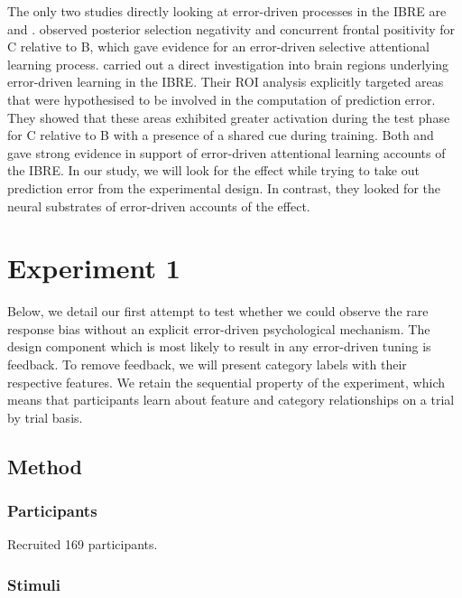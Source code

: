\documentclass[10pt,letterpaper]{article}
\begin{document}
The only two studies directly looking at error-driven processes in the IBRE are  and .
 observed posterior selection negativity and concurrent frontal positivity for C relative to B, which gave evidence for an error-driven selective attentional learning process.
 carried out a direct investigation into brain regions underlying error-driven learning in the IBRE.
Their ROI analysis explicitly targeted areas that were hypothesised to be involved in the computation of prediction error.
They showed that these areas exhibited greater activation during the test phase for C relative to B with a presence of a shared cue during training.
Both  and  gave strong evidence in support of error-driven attentional learning accounts of the IBRE.
In our study, we will look for the effect while trying to take out prediction error from the experimental design.
In contrast, they looked for the neural substrates of error-driven accounts of the effect.

\section{Experiment 1}

Below, we detail our first attempt to test whether we could observe the rare response bias without an explicit error-driven psychological mechanism.
The design component which is most likely to result in any error-driven tuning is feedback.
To remove feedback, we will present category labels with their respective features.
We retain the sequential property of the experiment, which means that participants learn about feature and category relationships on a trial by trial basis.

\subsection{Method}

\subsubsection*{Participants}

Recruited 169 participants.

\subsubsection*{Stimuli}
\end{document}
